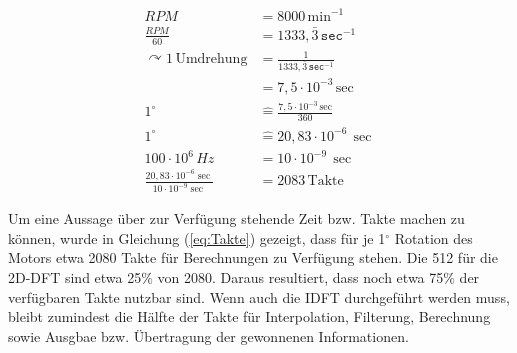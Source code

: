 

 
\begin{align}
    \nonumber RPM &= 8000\, \textrm{min}^{-1}\\[10pt] 
    \frac{RPM}{60} &= 1333,\bar{3}\,\texttt{sec}^{-1}  \\[10pt]
    \nonumber \curvearrowright 1\, \textrm{Umdrehung} &= \frac{1}{1333,\bar{3}\,\texttt{sec}^{-1}} \\[10pt] 
    &= 7,5\cdot 10^{-3}\,\textrm{sec}\\[10pt]
    \nonumber 1^\circ &\widehat{=} \frac{7,5\cdot 10^{-3}\,\textrm{sec}}{360}\\[10pt]
    1^\circ & \widehat{=} 20,83\cdot10^{-6}\,\sec \\[10pt]
    \nonumber 100\cdot10^6\,Hz &= 10\cdot10^{-9}\,\sec \\[10pt]
    \frac{20,83\cdot10^{-6}\sec}{10\cdot10^{-9}\sec} &= 2083\, \textrm{Takte} \label{eq:Takte}
\end{align}


 Um eine Aussage über zur Verfügung stehende Zeit bzw. Takte machen zu können, wurde in Gleichung (\ref{eq:Takte}) gezeigt, dass für je 1${}^\circ$ Rotation des Motors
 etwa 2080 Takte für Berechnungen zu Verfügung stehen.
 Die 512 für die 2D-DFT sind etwa 25$\%$ von 2080. Daraus resultiert, dass noch etwa 75$\%$ der verfügbaren Takte nutzbar sind. Wenn auch die IDFT durchgeführt werden muss, bleibt 
 zumindest die Hälfte der Takte für Interpolation, Filterung, Berechnung sowie Ausgbae bzw. Übertragung der gewonnenen Informationen. 
 
